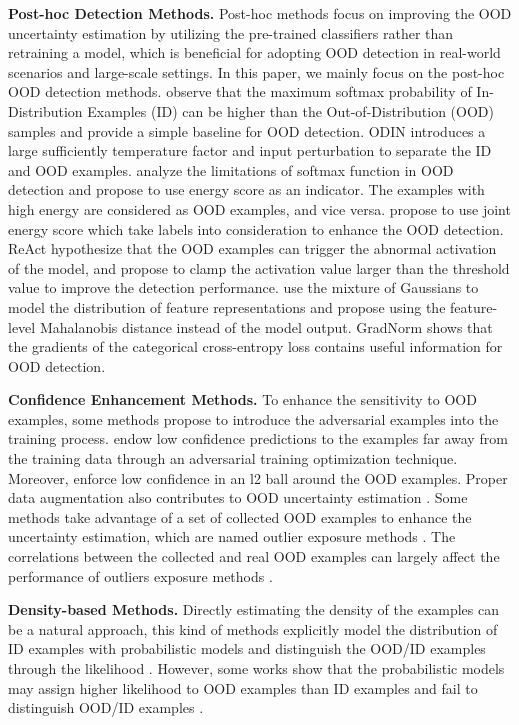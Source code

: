 \documentclass{article}
\begin{document}
\textbf{Post-hoc Detection Methods.} Post-hoc methods focus on improving the OOD uncertainty estimation by utilizing the pre-trained classifiers rather than retraining a model, which is beneficial for adopting OOD detection in real-world scenarios and large-scale settings. In this paper, we mainly focus on the post-hoc OOD detection methods. \citet{hendrycks17baseline} observe that the maximum softmax probability of In-Distribution Examples (ID) can be higher than the Out-of-Distribution (OOD) samples and provide a simple baseline for OOD detection. ODIN \cite{ODIN} introduces a large sufficiently temperature factor and input perturbation to separate the ID and OOD examples. \citet{liu2020energy} analyze the limitations of softmax function in OOD detection and propose to use energy score as an indicator. The examples with high energy are considered as OOD examples, and vice versa. \citet{wang2021can} propose to use joint energy score which take labels into consideration to enhance the OOD detection. ReAct \cite{sun2021react} hypothesize that the OOD examples can trigger the abnormal activation of the model, and propose to clamp the activation value larger than the threshold value to improve the detection performance. \citet{Mahalanobis} use the mixture of Gaussians to model the distribution of feature representations and propose using the feature-level Mahalanobis distance instead of the model output. GradNorm \cite{huang2021importance} shows that the gradients of the categorical cross-entropy loss contains useful information for OOD detection.

\textbf{Confidence Enhancement Methods.}
To enhance the sensitivity to OOD examples, some methods propose to introduce the adversarial examples into the training process. \citet{hein2019relu} endow low confidence predictions to the examples far away from the training data through an adversarial training optimization technique. Moreover, \citet{bitterwolf2020certifiably} enforce low confidence in an l2 ball around the OOD examples. Proper data augmentation also contributes to OOD uncertainty estimation \cite{hendrycks*2020augmix,yun2019cutmix,thulasidasan2019mixup}. Some methods take advantage of a set of collected OOD examples to enhance the uncertainty estimation, which are named outlier exposure methods \cite{hendrycks2018deep,papadopoulos2021outlier,chen2021atom}. The correlations between the collected and real OOD examples can largely affect the performance of outliers exposure methods \cite{shafaei2019less}. 

\textbf{Density-based Methods.}
Directly estimating the density of the examples can be a natural approach, this kind of methods explicitly model the distribution of ID examples with probabilistic models and distinguish the OOD/ID examples through the likelihood \cite{kobyzev2020normalizing,zisselman2020deep,serra2019input,xiao2020likelihood}. However, some works show that the probabilistic models may assign higher likelihood to OOD examples than ID examples and fail to distinguish OOD/ID examples \cite{nalisnick2018deep,kirichenko2020normalizing}.
\end{document}
